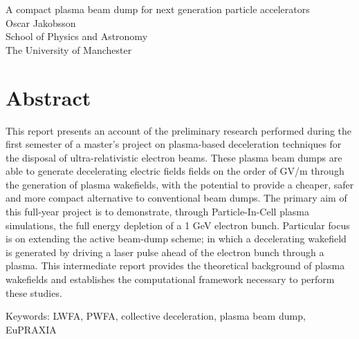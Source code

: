 \noindent A compact plasma beam dump for next generation particle accelerators \\
Oscar Jakobsson\\
School of Physics and Astronomy\\
The University of Manchester \setlength{\parskip}{0.5cm}

\thispagestyle{plain}			%
\setlength{\parskip}{0pt plus 1.0pt}
\section*{Abstract}
This report presents an account of the preliminary research performed during the first semester of a master's project on plasma-based deceleration techniques for the disposal of ultra-relativistic electron beams. These plasma beam dumps are able to generate decelerating electric fields fields on the order of GV/m through the generation of plasma wakefields, with the potential to provide a cheaper, safer and more compact alternative to conventional beam dumps. The primary aim of this full-year project is to demonstrate, through Particle-In-Cell plasma simulations, the full energy depletion of a 1 GeV electron bunch. Particular focus is on extending the active beam-dump scheme; in which a decelerating wakefield is generated by driving a laser pulse ahead of the electron bunch through a plasma. This intermediate report provides the theoretical background of plasma wakefields and establishes the computational framework necessary to perform these studies. 


\vfill
Keywords: LWFA, PWFA, collective deceleration, plasma beam dump, EuPRAXIA

